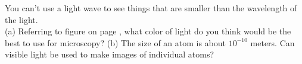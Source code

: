 You can't use a light wave to see things that are smaller than the wavelength of the light.\\
(a) Referring to figure  on
page \pageref{fig:em-spectrum}, what color of light do you think would be the best to use
for microscopy?\hwendpart
(b) The size of an atom is about $10^{-10}$ meters. Can visible light be used to make images
of individual atoms?
